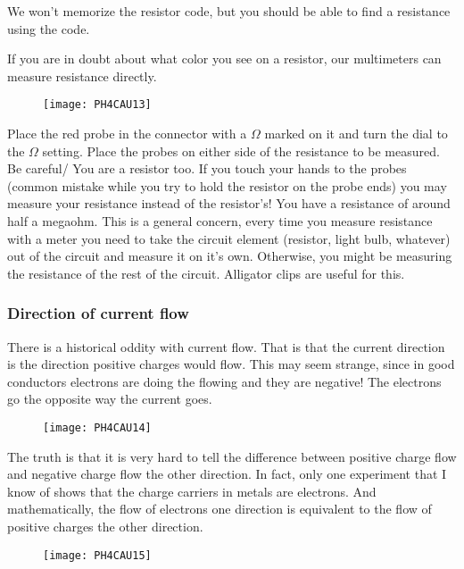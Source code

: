 We won't memorize the resistor code, but you should be able to find a
resistance using the code.

If you are in doubt about what color you see on a resistor, our multimeters
can measure resistance directly. 

\begin{figure}[h!]
	\centering
    \texttt{[image: PH4CAU13]}
\end{figure}

Place the red probe in the
connector with a $\Omega $ marked on it and turn the dial to the $\Omega $
setting. Place the probes on either side of the resistance to be measured.
Be careful/ You are a resistor too. If you touch your hands to the probes
(common mistake while you try to hold the resistor on the probe ends) you
may measure your resistance instead of the resistor's! You have a resistance
of around half a megaohm. This is a general concern, every time you measure
resistance with a meter you need to take the circuit element (resistor,
light bulb, whatever) out of the circuit and measure it on it's own.
Otherwise, you might be measuring the resistance of the rest of the circuit.
Alligator clips are useful for this.

\subsubsection{Direction of current flow}

There is a historical oddity with current flow. That is that the current
direction is the direction positive charges would flow. This may seem
strange, since in good conductors electrons are doing the flowing and they
are negative! The electrons go the opposite way the current goes. 

\begin{figure}[h!]
	\centering
     \texttt{[image: PH4CAU14]}
\end{figure}
The truth is that it is very hard to tell the difference between positive
charge flow and negative charge flow the other direction. In fact, only one
experiment that I know of shows that the charge carriers in metals are
electrons. And mathematically, the flow of electrons one direction is
equivalent to the flow of positive charges the other direction.

\begin{figure}[h!]
     \centering
     \texttt{[image: PH4CAU15]}
\end{figure}

